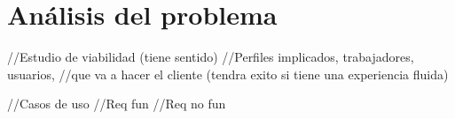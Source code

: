 \chapter{Análisis del problema}
 
//Estudio de viabilidad (tiene sentido)
//Perfiles implicados, trabajadores, usuarios, 
//que va a hacer el cliente (tendra exito si tiene una experiencia fluida)

//Casos de uso
//Req fun
//Req no fun

